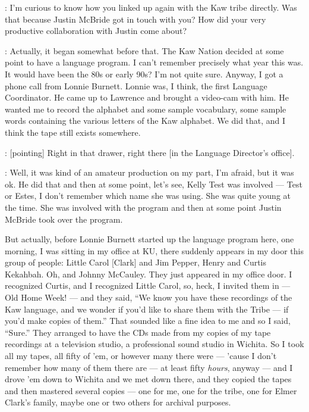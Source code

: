 \documentclass[output=paper]{LSP/langsci}
\begin{document}
: I'm curious to know how you linked up again with the Kaw tribe directly. Was that because Justin McBride got in touch with you? How did your very productive collaboration with Justin come about?

: Actually, it began somewhat before that. The Kaw Nation decided at some point to have a language program. I can't remember precisely what year this was. It would have been the 80s or early 90s? I'm not quite sure. Anyway, I got a phone call from Lonnie Burnett. Lonnie was, I think, the first Language Coordinator. He came up to Lawrence and brought a video-cam with him. He wanted me to record the alphabet and some sample vocabulary, some sample words containing the various letters of the Kaw alphabet. We did that, and I think the tape still exists somewhere.

: [pointing] Right in that drawer, right there [in the Language Director's office].

: Well, it was kind of an amateur production on my part, I'm afraid, but it was ok. He did that and then at some point, let's see, Kelly Test was involved --- Test or Estes, I don't remember which name she was using. She was quite young at the time. She was involved with the program and then at some point Justin McBride took over the program. 

But actually, before Lonnie Burnett started up the language program here, one morning, I was sitting in my office at KU, there suddenly appears in my door this group of people: Little Carol [Clark] and Jim Pepper, Henry and Curtis Kekahbah. Oh, and Johnny McCauley. They just appeared in my office door. I recognized Curtis, and I recognized Little Carol, so, heck, I invited them in --- Old Home Week! --- and they said, ``We know you have these recordings of the Kaw language, and we wonder if you'd like to share them with the Tribe --- if you'd make copies of them.'' That sounded like a fine idea to me and so I said, ``Sure.'' They arranged to have the CDs made from my copies of my tape recordings at a television studio, a professional sound studio in Wichita. So I took all my tapes, all fifty of 'em, or however many there were --- 'cause I don't remember how many of them there are --- at least fifty \textit{hours}, anyway --- and I drove 'em down to Wichita and we met down there, and they copied the tapes and then mastered several copies --- one for me, one for the tribe, one for Elmer Clark's family, maybe one or two others for archival purposes. 
\end{document}
